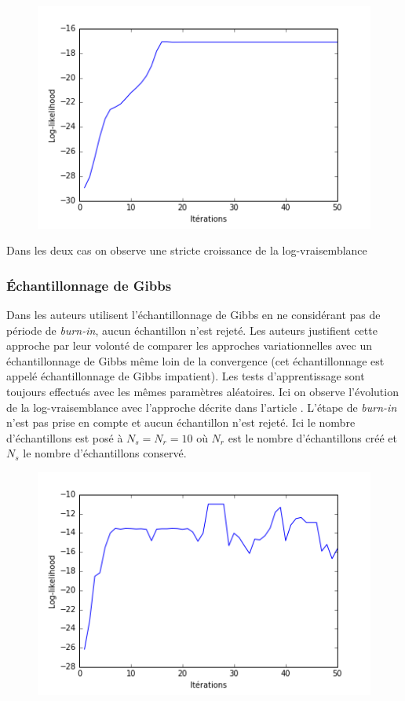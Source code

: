 \documentclass[10pt,a4paper]{article}
\begin{document}
\begin{figure}[H]
\centering
\includegraphics[scale=0.5]{../resources/pictures/M3_K2_fhmm_exact.png}
\end{figure}
Dans les deux cas on observe une stricte croissance de la log-vraisemblance

\subsubsection{Échantillonnage de Gibbs}

Dans \cite{ghahramani1997factorial} les auteurs utilisent l'échantillonnage
de Gibbs en ne considérant pas de période de \textit{burn-in}, aucun
échantillon n'est rejeté.
Les auteurs justifient cette approche par leur volonté de comparer les
approches variationnelles avec un échantillonnage de Gibbs même loin de la
convergence (cet échantillonnage est appelé échantillonnage de Gibbs
impatient).
Les tests d'apprentissage sont toujours effectués avec les mêmes paramètres
aléatoires.
Ici on observe l'évolution de la log-vraisemblance avec l'approche décrite dans
l'article \cite{ghahramani1997factorial}.
L'étape de \textit{burn-in} n'est pas prise en compte et aucun échantillon
n'est rejeté.
Ici le nombre d'échantillons est posé à $N_s=N_r=10$ où $N_r$ est le nombre
d'échantillons créé et $N_s$ le nombre d'échantillons conservé.

\begin{figure}[H]
  \centering
  \includegraphics[scale=0.5]{../resources/pictures/M3_K2_gibbsnoburning.png}
\end{figure}
\end{document}

